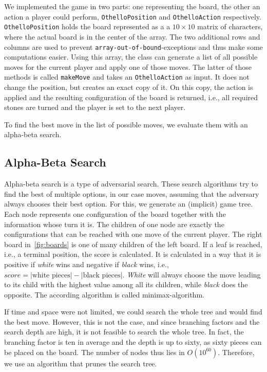 We implemented the game in two parts: one representing the board, the other an action a player could perform, \texttt{OthelloPosition} and \texttt{OthelloAction} respectively.
\texttt{OthelloPosition} holds the board represented as a a $10\times 10$ matrix of characters, where the actual board is in the center of the array.
The two additional rows and columns are used to prevent \texttt{array-out-of-bound}-exceptions and thus make some computations easier.
Using this array, the class can generate a list of all possible moves for the current player and apply one of those moves.
The latter of those methods is called \texttt{makeMove} and takes an \texttt{OthelloAction} as input.
It does not change the position, but creates an exact copy of it.
On this copy, the action is applied and the resulting configuration of the board is returned, i.e., all required stones are turned and the player is set to the next player.

To find the best move in the list of possible moves, we evaluate them with an alpha-beta search.

\subsection{Alpha-Beta Search}
Alpha-beta search is a type of adversarial search.
These search algorithms try to find the best of multiple options, in our case moves, assuming that the adversary always chooses their best option.
For this, we generate an (implicit) game tree.
Each node represents one configuration of the board together with the information whose turn it is.
The children of one node are exactly the configurations that can be reached with one move of the current player.
The right board in~\cref{fig:boards} is one of many children of the left board.
If a leaf is reached, i.e., a terminal position, the score is calculated.
It is calculated in a way that it is positive if \textit{white} wins and negative if \textit{black} wins, i.e., $score = |\text{white pieces}| - |\text{black pieces}|$.
\textit{White} will always choose the move leading to its child with the highest value among all its children, while \textit{black} does the opposite.
The according algorithm is called minimax-algorithm.

If time and space were not limited, we could search the whole tree and would find the best  move.
However, this is not the case, and since branching factors and the search depth are high, it is not feasible to search the whole tree.
In fact, the branching factor is ten in average and the depth is up to sixty, as sixty pieces can be placed on the board.
The number of nodes thus lies in $O(10^{60})$.
Therefore, we use an algorithm that prunes the search tree.

